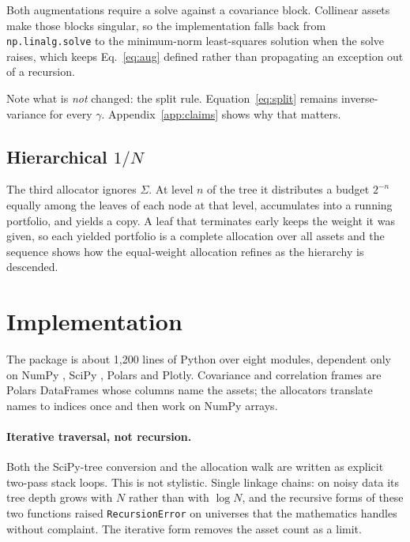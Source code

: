 \documentclass[11pt,a4paper]{article}
\newcommand{\code}[1]{\texttt{#1}}
\begin{document}
Both augmentations require a solve against a covariance block. Collinear assets
make those blocks singular, so the implementation falls back from
\code{np.linalg.solve} to the minimum-norm least-squares solution when the solve
raises, which keeps Eq.~\eqref{eq:aug} defined rather than propagating an
exception out of a recursion.

Note what is \emph{not} changed: the split rule. Equation~\eqref{eq:split}
remains inverse-variance for every $\gamma$. Appendix~\ref{app:claims} shows why
that matters.

\subsection{Hierarchical \texorpdfstring{$1/N$}{1/N}}

The third allocator ignores $\Sigma$. At level $n$ of the tree it distributes a
budget $2^{-n}$ equally among the leaves of each node at that level, accumulates
into a running portfolio, and yields a copy. A leaf that terminates early keeps
the weight it was given, so each yielded portfolio is a complete allocation over
all assets and the sequence shows how the equal-weight allocation refines as the
hierarchy is descended.

\section{Implementation}
\label{sec:impl}

The package is about 1{,}200 lines of Python over eight modules, dependent only
on NumPy \citep{harris2020}, SciPy \citep{virtanen2020}, Polars \citep{polars}
and Plotly. Covariance and correlation frames are Polars DataFrames whose
columns name the assets; the allocators translate names to indices once and
then work on NumPy arrays.

\paragraph{Iterative traversal, not recursion.}
Both the SciPy-tree conversion and the allocation walk are written as explicit
two-pass stack loops. This is not stylistic. Single linkage chains: on noisy
data its tree depth grows with $N$ rather than with $\log N$, and the recursive
forms of these two functions raised \code{RecursionError} on universes that the
mathematics handles without complaint. The iterative form removes the asset
count as a limit.
\end{document}
